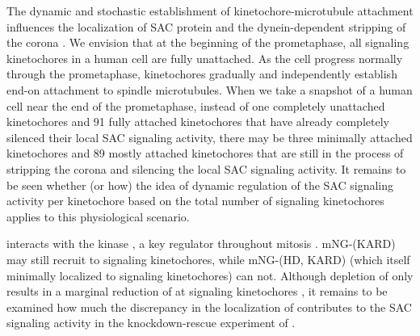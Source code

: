 The dynamic and stochastic establishment of kinetochore-microtubule attachment influences the localization of SAC protein and the dynein-dependent stripping of the corona \cite{SACSilencing_Etemad2019, SACSilencing_Kuhn2019, CENP-FLimitsStripping}. We envision that at the beginning of the prometaphase, all signaling kinetochores in a human cell are fully unattached. As the cell progress normally through the prometaphase, kinetochores gradually and independently establish end-on attachment to spindle microtubules. When we take a snapshot of a human cell near the end of the prometaphase, instead of one completely unattached kinetochores and 91 fully attached kinetochores that have already completely silenced their local SAC signaling activity, there may be three minimally attached kinetochores and 89 mostly attached kinetochores that are still in the process of stripping the corona and silencing the local SAC signaling activity. It remains to be seen whether (or how) the idea of dynamic regulation of the SAC signaling activity per kinetochore based on the total number of signaling kinetochores applies to this physiological scenario. %

 interacts with the kinase , a key regulator throughout mitosis \cite{BUBR1-PLK1}. mNG-(\textDelta{}KARD) may still recruit  to signaling kinetochores, while mNG-(\textDelta{}HD, \textDelta{}KARD) (which itself minimally localized to signaling kinetochores) can not. Although depletion of  only results in a marginal reduction of  at signaling kinetochores \cite{CENPU+BUB1-PLK1}, it remains to be examined how much the discrepancy in the localization of  contributes to the SAC signaling activity in the knockdown-rescue experiment of .


